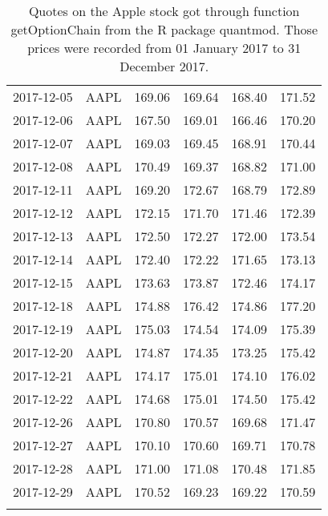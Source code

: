 \documentclass[a4paper, 12pt]{report}
\begin{document}
\begin{appendices}
\begin{longtable}{llllll}
  2017-12-05 & AAPL & 169.06 & 169.64 & 168.40 & 171.52 \\ 
  2017-12-06 & AAPL & 167.50 & 169.01 & 166.46 & 170.20 \\ 
  2017-12-07 & AAPL & 169.03 & 169.45 & 168.91 & 170.44 \\ 
  2017-12-08 & AAPL & 170.49 & 169.37 & 168.82 & 171.00 \\ 
  2017-12-11 & AAPL & 169.20 & 172.67 & 168.79 & 172.89 \\ 
  2017-12-12 & AAPL & 172.15 & 171.70 & 171.46 & 172.39 \\ 
  2017-12-13 & AAPL & 172.50 & 172.27 & 172.00 & 173.54 \\ 
  2017-12-14 & AAPL & 172.40 & 172.22 & 171.65 & 173.13 \\ 
  2017-12-15 & AAPL & 173.63 & 173.87 & 172.46 & 174.17 \\ 
  2017-12-18 & AAPL & 174.88 & 176.42 & 174.86 & 177.20 \\ 
  2017-12-19 & AAPL & 175.03 & 174.54 & 174.09 & 175.39 \\ 
  2017-12-20 & AAPL & 174.87 & 174.35 & 173.25 & 175.42 \\ 
  2017-12-21 & AAPL & 174.17 & 175.01 & 174.10 & 176.02 \\ 
  2017-12-22 & AAPL & 174.68 & 175.01 & 174.50 & 175.42 \\ 
  2017-12-26 & AAPL & 170.80 & 170.57 & 169.68 & 171.47 \\ 
  2017-12-27 & AAPL & 170.10 & 170.60 & 169.71 & 170.78 \\ 
  2017-12-28 & AAPL & 171.00 & 171.08 & 170.48 & 171.85 \\ 
  2017-12-29 & AAPL & 170.52 & 169.23 & 169.22 & 170.59 \\ 
   \hline
\caption[Market stock data (AAPL)]{Quotes on the Apple stock got through function getOptionChain from the R package quantmod. Those prices were recorded from 01 January 2017 to 31 December 2017.}
\label{t:market:stock}
\end{longtable}
\end{appendices}












\end{document}
